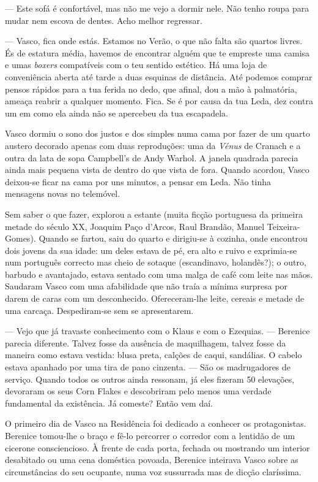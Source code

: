 --- Este sofá é confortável, mas não me vejo a dormir nele. Não tenho
  roupa para mudar nem escova de dentes. Acho melhor regressar.

--- Vasco, fica onde estás. Estamos no Verão, o que não falta são quartos
  livres. És de estatura média, havemos de encontrar alguém que te
  empreste uma camisa e umas \emph{boxers }compatíveis com o teu sentido
  estético. Há uma loja de conveniência aberta até tarde a duas
  esquinas de distância. Até podemos comprar pensos rápidos para a tua
  ferida no dedo, que afinal, dou a mão à palmatória, ameaça reabrir a
  qualquer momento. Fica. Se é por causa da tua Leda, dez contra um em
  como ela ainda não se apercebeu da tua escapadela.

Vasco dormiu o sono dos justos e dos simples numa cama por fazer de um
quarto austero decorado apenas com duas reproduções: uma da
\emph{Vénus }de Cranach e a outra da lata de sopa Campbell's de Andy
Warhol. A janela quadrada parecia ainda mais pequena vista de dentro do
que vista de fora. Quando acordou, Vasco deixou-se ficar na cama por uns
minutos, a pensar em Leda. Não tinha mensagens novas no telemóvel.

Sem saber o que fazer, explorou a estante (muita ficção portuguesa da
primeira metade do século XX, Joaquim Paço d'Arcos, Raul Brandão, Manuel
Teixeira-Gomes). Quando se fartou, saiu do quarto e dirigiu-se à
cozinha, onde encontrou dois jovens da sua idade: um deles estava de pé,
era alto e ruivo e exprimia-se num português correcto mas cheio de
sotaque (escandinavo, holandês?); o outro, barbudo e avantajado, estava
sentado com uma malga de café com leite nas mãos. Saudaram Vasco com uma
afabilidade que não traía a mínima surpresa por darem de caras com um
desconhecido. Ofereceram-lhe leite, cereais e metade de uma carcaça.
Despediram-se sem se apresentarem.

--- Vejo que já travaste conhecimento com o Klaus e com o Ezequias. ---
  Berenice parecia diferente. Talvez fosse da ausência de maquilhagem,
  talvez fosse da maneira como estava vestida: blusa preta, calções de
  caqui, sandálias. O cabelo estava apanhado por uma tira de pano
  cinzenta. --- São os madrugadores de serviço. Quando todos os outros
  ainda ressonam, já eles fizeram 50 elevações, devoraram os seus Corn
  Flakes e descobriram pelo menos uma verdade fundamental da existência.
  Já comeste? Então vem daí.

O primeiro dia de Vasco na Residência foi dedicado a conhecer os
protagonistas. Berenice tomou-lhe o braço e fê-lo percorrer o corredor com a lentidão de um cicerone consciencioso.
À frente de cada porta, fechada ou mostrando um interior desabitado ou
uma cena doméstica povoada, Berenice inteirava Vasco sobre as
circunstâncias do seu ocupante, numa voz sussurrada mas de dicção
claríssima.

